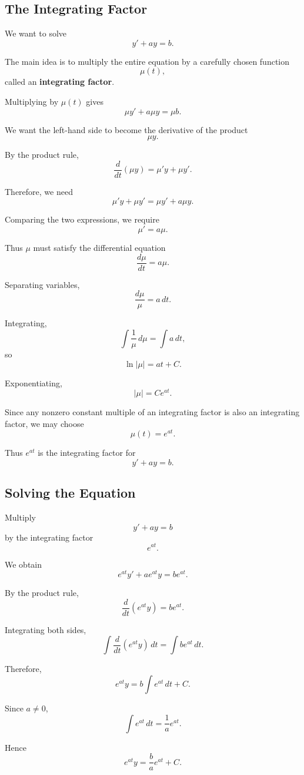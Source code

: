 \documentclass[11pt]{article}
\begin{document}
\subsection{The Integrating Factor}

We want to solve
\[
y'+ay=b.
\]

The main idea is to multiply the entire equation by a carefully chosen function
\[
\mu(t),
\]
called an \textbf{integrating factor}.

Multiplying by \(\mu(t)\) gives
\[
\mu y'+a\mu y=\mu b.
\]

We want the left-hand side to become the derivative of the product
\[
\mu y.
\]

By the product rule,
\[
\frac{d}{dt}(\mu y)
=
\mu' y+\mu y'.
\]

Therefore, we need
\[
\mu' y+\mu y'
=
\mu y'+a\mu y.
\]

Comparing the two expressions, we require
\[
\mu'=a\mu.
\]

Thus \(\mu\) must satisfy the differential equation
\[
\frac{d\mu}{dt}=a\mu.
\]

Separating variables,
\[
\frac{d\mu}{\mu}=a\,dt.
\]

Integrating,
\[
\int\frac{1}{\mu}\,d\mu
=
\int a\,dt,
\]
so
\[
\ln|\mu|=at+C.
\]

Exponentiating,
\[
|\mu|=Ce^{at}.
\]

Since any nonzero constant multiple of an integrating factor is also an integrating factor, we may choose
\[
\boxed{\mu(t)=e^{at}}.
\]

Thus \(e^{at}\) is the integrating factor for
\[
y'+ay=b.
\]

\subsection{Solving the Equation}

Multiply
\[
y'+ay=b
\]
by the integrating factor
\[
e^{at}.
\]

We obtain
\[
e^{at}y'+ae^{at}y
=
be^{at}.
\]

By the product rule,
\[
\frac{d}{dt}\left(e^{at}y\right)
=
be^{at}.
\]

Integrating both sides,
\[
\int
\frac{d}{dt}\left(e^{at}y\right)\,dt
=
\int be^{at}\,dt.
\]

Therefore,
\[
e^{at}y
=
b\int e^{at}\,dt+C.
\]

Since \(a\neq 0\),
\[
\int e^{at}\,dt
=
\frac{1}{a}e^{at}.
\]

Hence
\[
e^{at}y
=
\frac{b}{a}e^{at}+C.
\]
\end{document}
